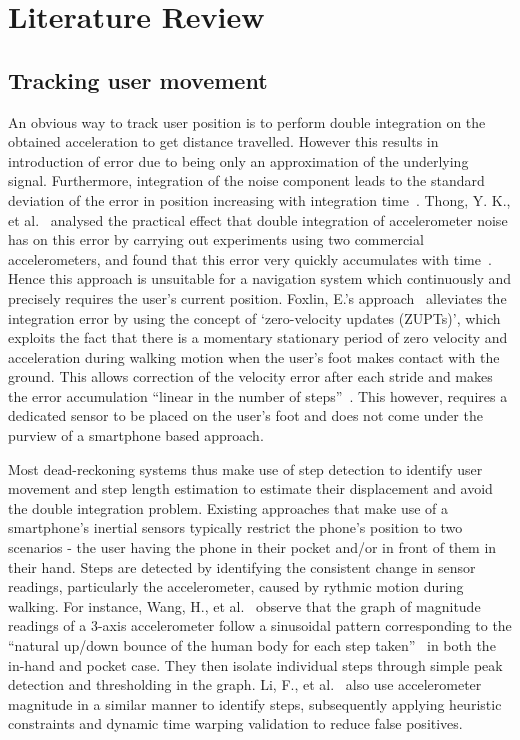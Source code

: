 \documentclass[12pt,a4paper,notitlepage]{report}
\title{}
\author{}
\date{}
\begin{document}
\chapter*{Literature Review}

\section*{Tracking user movement}

An obvious way to track user position is to perform double integration on the obtained acceleration to get distance travelled. However this results in introduction of error due to being only an approximation of the underlying signal. Furthermore, integration of the noise component leads to the standard deviation of the error in position increasing with integration time~\cite[p.73]{integrationError}. Thong, Y. K., et al.~\cite{integrationErrorPractical} analysed the practical effect that double integration of accelerometer noise has on this error by carrying out experiments using two commercial accelerometers, and found that this error very quickly accumulates with time~\cite[p.1168]{integrationErrorPractical}. Hence this approach is unsuitable for a navigation system which continuously and precisely requires the user’s current position. Foxlin, E.'s approach~\cite{foxlin2005pedestrian} alleviates the integration error by using the concept of `zero-velocity updates (ZUPTs)’, which exploits the fact that there is a momentary stationary period of zero velocity and acceleration during walking motion when the user’s foot makes contact with the ground. This allows correction of the velocity error after each stride and makes the error accumulation ``linear in the number of steps''~\cite[p.38]{foxlin2005pedestrian}. This however, requires a dedicated sensor to be placed on the user’s foot and does not come under the purview of a smartphone based approach. 


Most dead-reckoning systems thus make use of step detection to identify user movement and step length estimation to estimate their displacement and avoid the double integration problem. Existing approaches that make use of a smartphone’s inertial sensors typically restrict the phone’s position to two scenarios - the user having the phone in their pocket and/or in front of them in their hand. Steps are detected by identifying the consistent change in sensor readings, particularly the accelerometer, caused by rythmic motion during walking. For instance, Wang, H., et al.~\cite{wang2012no} observe that the graph of magnitude readings of a 3-axis accelerometer follow a sinusoidal pattern corresponding to the ``natural up/down bounce of the human body for each step taken''~\cite[p.203]{wang2012no} in both the in-hand and pocket case. They then isolate individual steps through simple peak detection and thresholding in the graph. Li, F., et al.~\cite{li2012reliable} also use accelerometer magnitude in a similar manner to identify steps, subsequently applying heuristic constraints and dynamic time warping validation to reduce false positives.  
\end{document}
